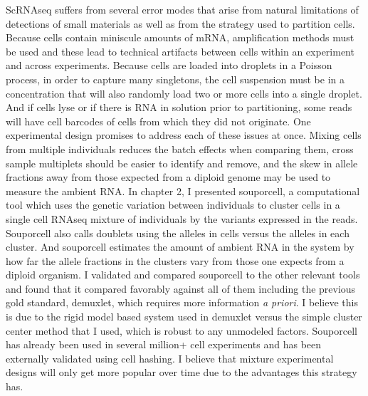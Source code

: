 \par{
ScRNAseq suffers from several error modes that arise from natural limitations of detections of small materials as well as from the strategy used to partition cells. Because cells contain miniscule amounts of mRNA, amplification methods must be used and these lead to technical artifacts between cells within an experiment and across experiments. Because cells are loaded into droplets in a Poisson process, in order to capture many singletons, the cell suspension must be in a concentration that will also randomly load two or more cells into a single droplet. And if cells lyse or if there is RNA in solution prior to partitioning, some reads will have cell barcodes of cells from which they did not originate. One experimental design promises to address each of these issues at once. Mixing cells from multiple individuals reduces the batch effects when comparing them, cross sample multiplets should be easier to identify and remove, and the skew in allele fractions away from those expected from a diploid genome may be used to measure the ambient RNA. In chapter 2, I presented souporcell, a computational tool which uses the genetic variation between individuals to cluster cells in a single cell RNAseq mixture of individuals by the variants expressed in the reads. Souporcell also calls doublets using the alleles in cells versus the alleles in each cluster. And souporcell estimates the amount of ambient RNA in the system by how far the allele fractions in the clusters vary from those one expects from a diploid organism. I validated and compared souporcell to the other relevant tools and found that it compared favorably against all of them including the previous gold standard, demuxlet, which requires more information \textit{a priori}. I believe this is due to the rigid model based system used in demuxlet versus the simple cluster center method that I used, which is robust to any unmodeled factors. Souporcell has already been used in several million+ cell experiments and has been externally validated using cell hashing. I believe that mixture experimental designs will only get more popular over time due to the advantages this strategy has. 
}

